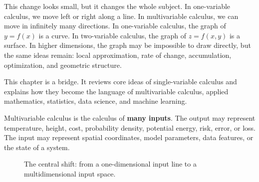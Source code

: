 This change looks small, but it changes the whole subject. In one-variable calculus, we move left or right along a line. In multivariable calculus, we can move in infinitely many directions. In one-variable calculus, the graph of $y=f(x)$ is a curve. In two-variable calculus, the graph of $z=f(x,y)$ is a surface. In higher dimensions, the graph may be impossible to draw directly, but the same ideas remain: local approximation, rate of change, accumulation, optimization, and geometric structure.

This chapter is a bridge. It reviews core ideas of single-variable calculus and explains how they become the language of multivariable calculus, applied mathematics, statistics, data science, and machine learning.

\begin{mainideabox}
Multivariable calculus is the calculus of \textbf{many inputs}. The output may represent temperature, height, cost, probability density, potential energy, risk, error, or loss. The input may represent spatial coordinates, model parameters, data features, or the state of a system.
\end{mainideabox}

\begin{figure}[H]
\centering
{}
\caption{The central shift: from a one-dimensional input line to a multidimensional input space.}
\label{fig:one-input-to-many-inputs}
\end{figure}

